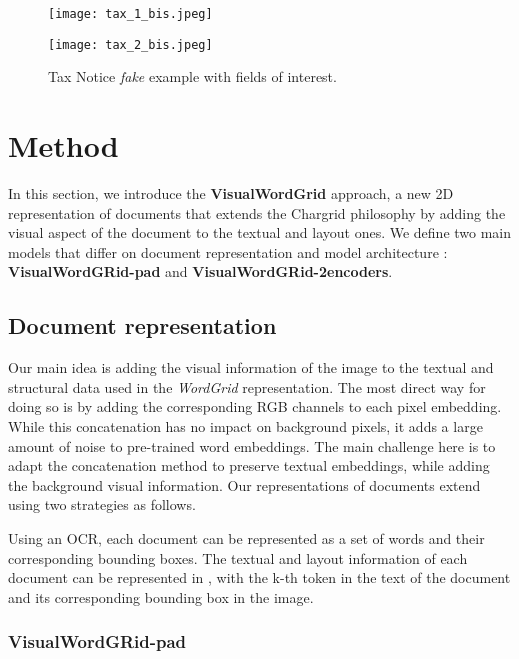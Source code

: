 \documentclass[conference]{IEEEtran}
\begin{document}
\begin{figure}[!h]
\begin{minipage}[t]{0.48\linewidth}
    \centering
    \texttt{[image: tax\_1\_bis.jpeg]}
    \label{f21}
\end{minipage}
\hspace{0.1cm}
\begin{minipage}[t]{0.48\linewidth} 
    \centering
    \texttt{[image: tax\_2\_bis.jpeg]}
    \label{f2}
\end{minipage}     
\caption{Tax Notice \textit{fake} example with fields of interest.}
\label{fig:tax}
\end{figure}  

\section{Method}

In this section, we introduce the \textbf{VisualWordGrid} approach, a new 2D representation of documents that extends the Chargrid philosophy by adding the visual aspect of the document to the textual and layout ones. We define two main models that differ on document representation and model architecture : \textbf{VisualWordGRid-pad} and \textbf{VisualWordGRid-2encoders}.

\subsection{Document representation}
Our main idea is adding the visual information of the image to the textual and structural data used in the \textit{WordGrid} representation. The most direct way for doing so is by adding the corresponding RGB channels to each pixel embedding. While this concatenation has no impact on background pixels, it adds a large amount of noise to pre-trained word embeddings. The main challenge here is to adapt the concatenation method to preserve textual embeddings, while adding the background visual information. Our representations of documents extend \cite{chargrid} using two strategies as follows.

Using an OCR, each document can be represented as a set of words and their corresponding bounding boxes. The textual and layout information of each document can be represented in  , with  the k-th token in the text of the document and  its corresponding bounding box in the image.
\newline

\subsubsection{VisualWordGRid-pad}\hfill
\end{document}
